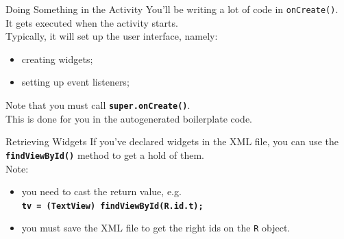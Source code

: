 \documentclass[aspectratio=169]{beamer}
\begin{document}
\begin{frame}{Doing Something in the Activity}
You'll be writing a lot of code in \texttt{onCreate()}.  \\
\vspace{1em}
It gets executed when the activity starts. \\
\vspace{1em}
Typically, it will set up the user interface, namely:
\begin{itemize}
\item creating widgets;
\item setting up event listeners;
\end{itemize}
\vspace{1em}
Note that you must call {\texttt{\textbf{super.onCreate()}}}. \\
\vspace{1em}
\quad This is done for you in the autogenerated boilerplate code.
\end{frame}



\begin{frame}{Retrieving Widgets}
If you've declared widgets in the XML file, you can use the {\texttt{\textbf{findViewById()}}} method to get a hold of them. \\
\vspace{1em}
Note:
\begin{itemize}
\item you need to cast the return value, e.g. \\
\texttt{\textbf{tv = (TextView) findViewById(R.id.t);}}
\item you must save the XML file to get the right ids on the {\tt R} object.
\end{itemize}
\end{frame}
\end{document}
